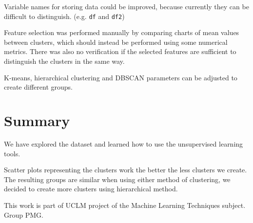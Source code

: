 \documentclass[sigconf]{acmart}
\begin{document}
Variable names for storing data could be improved, because currently they can be difficult to distinguish. (e.g. \texttt{df} and \texttt{df2})

Feature selection was performed manually by comparing charts of mean values between clusters, which should instead be performed using some numerical metrics. There was also no verification if the selected features are sufficient to distinguish the clusters in the same way.

K-means, hierarchical clustering and DBSCAN parameters can be adjusted to create different groups.

\section{Summary}
We have explored the dataset and learned how to use the unsupervised learning tools.

Scatter plots representing the clusters work the better the less clusters we create.
The resulting groups are similar when using either method of clustering, we decided to create more clusters using hierarchical method.

%
%

\begin{acks}
This work is part of UCLM project of the Machine Learning Techniques subject. Group PMG.
\end{acks}

%
%
\end{document}

